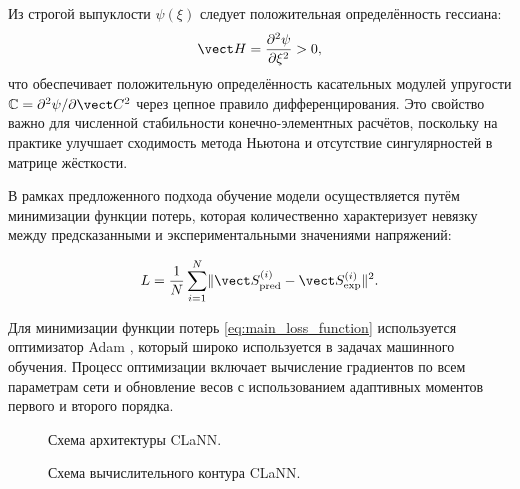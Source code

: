 
Из строгой выпуклости \(\psi(\xi)\) следует положительная определённость гессиана:
\begin{equation}
 \vect H = \frac{\partial^2\psi}{\partial\xi^2} > 0,
\label{eq:positive_hessian}
\end{equation}
что обеспечивает положительную определённость касательных модулей упругости 
$\mathbb{C} = \partial^2\psi/\partial\vect C^2$ через цепное правило дифференцирования. 
Это свойство важно для численной стабильности конечно-элементных расчётов, 
поскольку на практике улучшает сходимость метода Ньютона и отсутствие сингулярностей в матрице жёсткости.


В рамках предложенного подхода обучение модели осуществляется путём минимизации функции потерь, 
которая количественно характеризует невязку между предсказанными и экспериментальными значениями напряжений:

\begin{equation}
 L = \frac{1}{N}\sum_{i=1}^N \lVert \vect S^{(i)}_{\text{pred}} - \vect S^{(i)}_{\text{exp}} \rVert^2.
\label{eq:main_loss_function}
\end{equation}

Для минимизации функции потерь \eqref{eq:main_loss_function} используется оптимизатор Adam \cite{kingma2014adam}, 
который широко используется в задачах машинного обучения. 
Процесс оптимизации включает вычисление градиентов по всем параметрам сети и обновление весов 
с использованием адаптивных моментов первого и второго порядка.

\begin{figure}[H]
  \centering
  \resizebox{\textwidth}{!}{}
  \caption{Схема архитектуры CLaNN.}
  \label{fig:clann_arc}
  \label{fig:clann_icnn1_nn}
\end{figure}


\begin{figure}[H]
  \centering
  \resizebox{\textwidth}{!}{}
  \caption{Схема вычислительного контура CLaNN.}
  \label{fig:clann_pipeline}
\end{figure}

